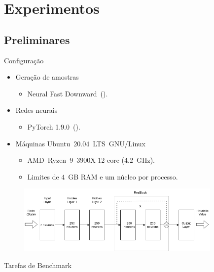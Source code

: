 \documentclass{beamer}
\begin{document}
\section{Experimentos}
\subsection{Preliminares}
\begin{frame}{Configuração}
\begin{itemize}
  \item Geração de amostras
  \begin{itemize}
    \item Neural Fast Downward~(\cite{Ferber.etal/2020a}).
  \end{itemize}
  \item Redes neurais
  \begin{itemize}
    \item PyTorch 1.9.0~(\cite{Paszke/2019}).
  \end{itemize}
  \item Máquinas Ubuntu~$20.04$~LTS~GNU/Linux
  \begin{itemize}
    \item AMD~Ryzen~$9$~$3900$X $12$-core ($4.2$~GHz).
    \item Limites de $4$~GB RAM e um núcleo por processo.
  \end{itemize}
\end{itemize}
\begin{figure}[tb]
    \centering
    \includegraphics[width=10cm]{img/resnet.png}
\end{figure}

\end{frame}


\begin{frame}{Tarefas de Benchmark}

\end{frame}
\end{document}
